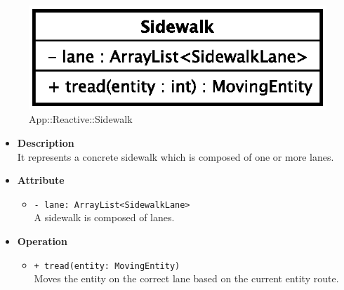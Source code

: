 \begin{figure}[h]
\centering
\includegraphics[scale=0.6,keepaspectratio]{images/solution/sidewalk.eps}
\caption{App::Reactive::Sidewalk}
\label{fig:sd-app-sidewalk}
\end{figure}
\FloatBarrier
\begin{itemize}
  \item \textbf{Description} \\
    It represents a concrete sidewalk which is composed of one or more lanes.
  \item \textbf{Attribute}
  \begin{itemize}
    \item \texttt{- lane: ArrayList<SidewalkLane>} \\
A sidewalk is composed of lanes.
  \end{itemize}
  \item \textbf{Operation}
  \begin{itemize} 
    \item \texttt{+ tread(entity: MovingEntity)} \\
Moves the entity on the correct lane based on the current entity route. 
  \end{itemize}
\end{itemize}
